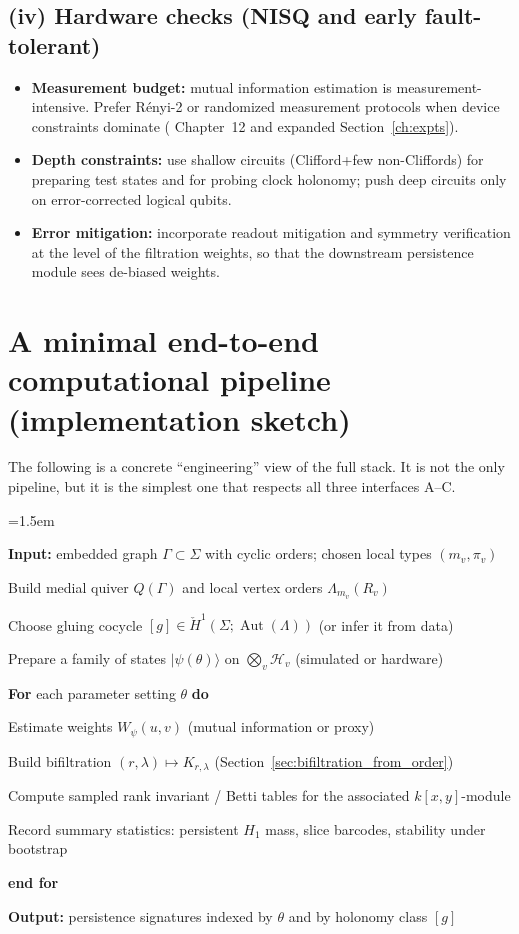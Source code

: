 \documentclass[11pt,oneside]{amsbook}
\numberwithin{equation}{section}
\newenvironment{algorithmic}[1][]{\par\begin{list}{}{\leftmargin=1.5em}\item[]}{\end{list}}
\newcommand{\State}{\par\noindent}
\newcommand{\For}[1]{\par\noindent\textbf{For} #1 \textbf{do}}
\newcommand{\EndFor}{\par\noindent\textbf{end for}}
\theoremstyle{plain}
\theoremstyle{definition}
\theoremstyle{remark}
\DeclareMathOperator{\Aut}{\mathrm{Aut}}
\newcommand{\cH}{\mathcal{H}}
\begin{document}
\subsection*{(iv) Hardware checks (NISQ and early fault-tolerant)}
\begin{itemize}
\item \textbf{Measurement budget:} mutual information estimation is measurement-intensive.
Prefer Rényi-2 or randomized measurement protocols when device constraints dominate ( Chapter~12 and expanded Section~\ref{ch:expts}).
\item \textbf{Depth constraints:} use shallow circuits (Clifford+few non-Cliffords) for preparing test states and for probing clock holonomy; push deep circuits only on error-corrected logical qubits.
\item \textbf{Error mitigation:} incorporate readout mitigation and symmetry verification at the level of the filtration weights, so that the downstream persistence module sees de-biased weights.
\end{itemize}

\section*{A minimal end-to-end computational pipeline (implementation sketch)}

The following is a concrete ``engineering'' view of the full stack.
It is not the only pipeline, but it is the simplest one that respects all three interfaces A--C.

\begin{algorithm}[H]
\caption{Surface-order $\to$ entanglement weights $\to$ 2-parameter persistence}
\begin{algorithmic}[1]
\State \textbf{Input:} embedded graph $\Gamma\subset\Sigma$ with cyclic orders; chosen local types $(m_v,\pi_v)$
\State Build medial quiver $Q(\Gamma)$ and local vertex orders $\Lambda_{m_v}(R_v)$
\State Choose gluing cocycle $[g]\in \check{H}^1(\Sigma;\Aut(\Lambda))$ (or infer it from data)
\State Prepare a family of states $|\psi(\theta)\rangle$ on $\bigotimes_{v}\cH_v$ (simulated or hardware)
\For{each parameter setting $\theta$}
  \State Estimate weights $W_\psi(u,v)$ (mutual information or proxy)
  \State Build bifiltration $(r,\lambda)\mapsto K_{r,\lambda}$ (Section~\ref{sec:bifiltration_from_order})
  \State Compute sampled rank invariant / Betti tables for the associated $k[x,y]$-module
  \State Record summary statistics: persistent $H_1$ mass, slice barcodes, stability under bootstrap
\EndFor
\State \textbf{Output:} persistence signatures indexed by $\theta$ and by holonomy class $[g]$
\end{algorithmic}
\end{algorithm}
\end{document}
